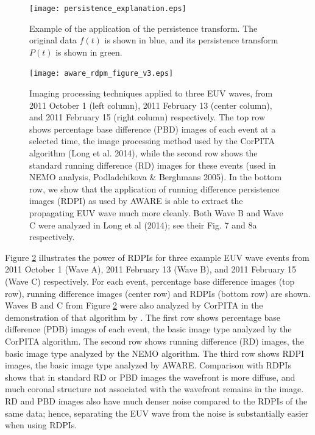 \begin{figure}
\begin{center}
\texttt{[image: persistence\_explanation.eps]}
\caption{Example of the application of the persistence transform.  The
original data $f(t)$ is shown in blue, and its persistence transform
$P(t)$ is shown in green.}
\label{fig:persistence}
\end{center}
\end{figure}

\begin{figure}
\begin{center}
\texttt{[image: aware\_rdpm\_figure\_v3.eps]}
\caption{Imaging processing techniques applied to three EUV waves,
  from 2011 October 1 (left column), 2011 February 13 (center column),
  and 2011 February 15 (right column) respectively. The top row shows
  percentage base difference (PBD) images of each event at a selected
  time, the image processing method used by the CorPITA algorithm
  (Long et al. 2014), while the second row shows the standard running
  difference (RD) images for these events (used in NEMO analysis,
  Podladchikova & Berghmans 2005). In the bottom row, we show that the
  application of running difference persistence images (RDPI) as used
  by AWARE is able to extract the propagating EUV wave much more
  cleanly. Both Wave B and Wave C were analyzed in Long et al (2014);
  see their Fig. 7 and 8a respectively.}
\label{rpdm_figure}
\end{center}
\end{figure}


Figure \ref{rpdm_figure} illustrates the power of RDPIs for three
example EUV wave events from 2011 October 1 (Wave A), 2011 February 13
(Wave B), and 2011 February 15 (Wave C) respectively. For each event,
percentage base difference images (top row), running difference images
(center row) and RDPIs (bottom row) are shown. Waves B and C from
Figure \ref{rpdm_figure} were also analyzed by CorPITA in the
demonstration of that algorithm by \citet{2014SoPh..289.3279L}.  The
first row shows percentage base difference (PDB) images of each event,
the basic image type analyzed by the CorPITA algorithm.  The second
row shows running difference (RD) images, the basic image type
analyzed by the NEMO algorithm.  The third row shows RDPI images, the
basic image type analyzed by AWARE. Comparison with RDPIs shows that
in standard RD or PBD images the wavefront is more diffuse, and much
coronal structure not associated with the wavefront remains in the
image. RD and PBD images also have much denser noise compared to the
RDPIs of the same data; hence, separating the EUV wave from the noise
is substantially easier when using RDPIs.

